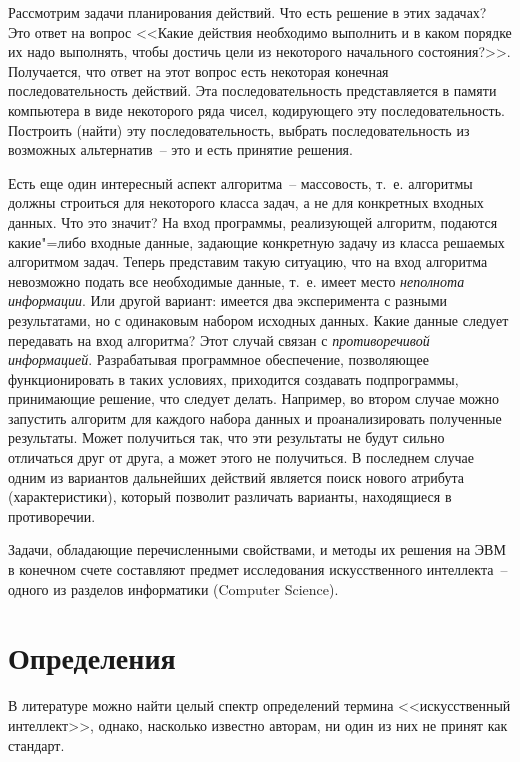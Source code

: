 \documentclass[a4paper,14pt, openany, twoside, final]{extbook} %
\begin{document}
Рассмотрим задачи планирования действий. Что есть решение в этих задачах? Это ответ на вопрос <<Какие действия необходимо выполнить и в каком порядке их надо выполнять, чтобы достичь цели из некоторого начального состояния?>>. Получается, что ответ на этот вопрос есть некоторая конечная последовательность действий. Эта последовательность представляется в памяти компьютера в виде некоторого ряда чисел, кодирующего эту последовательность. Построить (найти) эту последовательность, выбрать последовательность из возможных альтернатив~-- это и есть принятие решения.

Есть еще один интересный аспект алгоритма~-- массовость, т.~е. алгоритмы должны строиться для некоторого класса задач, а не для конкретных входных данных. Что это значит? На вход программы, реализующей алгоритм, подаются какие"=либо входные данные, задающие конкретную задачу из класса решаемых алгоритмом задач. Теперь представим такую ситуацию, что на вход алгоритма невозможно подать все необходимые данные, т.~е. имеет место \emph{неполнота информации}. Или другой вариант: имеется два эксперимента с разными результатами, но с одинаковым набором исходных данных. Какие данные следует передавать на вход алгоритма? Этот случай связан с \emph{противоречивой информацией}. Разрабатывая программное обеспечение, позволяющее функционировать в таких условиях, приходится создавать подпрограммы, принимающие решение, что следует делать. Например, во втором случае можно запустить алгоритм для каждого набора данных и проанализировать полученные результаты. Может получиться так, что эти результаты не будут сильно отличаться друг от друга, а может этого не получиться. В последнем случае одним из вариантов дальнейших действий является поиск нового атрибута (характеристики), который позволит различать варианты, находящиеся в противоречии.

Задачи,  обладающие перечисленными свойствами, и методы их решения на ЭВМ в конечном счете составляют предмет исследования искусственного интеллекта~-- одного из разделов информатики (Computer Science).
\enlargethispage{-3em}

\section{Определения}

В литературе можно найти целый спектр определений термина <<искусственный интеллект>>, однако, насколько известно авторам, ни один из них не принят как стандарт.
\end{document}
